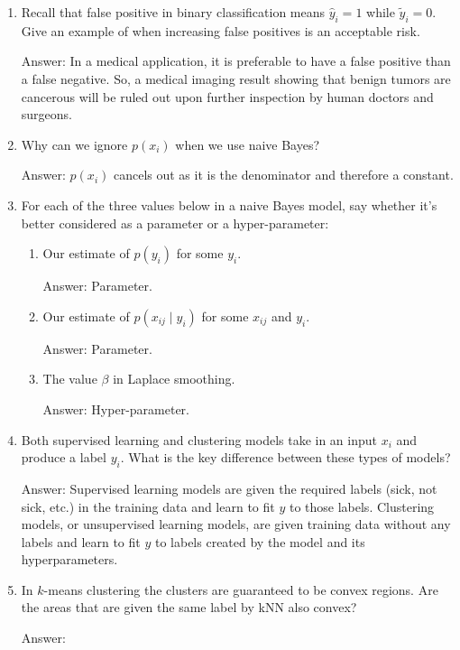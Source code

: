 \documentclass{article}
\newenvironment{answer}{\par\begingroup\color{gre}Answer: }{\endgroup}
\begin{document}
\begin{enumerate}
\begin{answer}
        \end{answer}
        \item Recall that false positive in binary classification means $\hat y_i=1$ while $\tilde y_i = 0$. Give an example of when increasing false positives is an acceptable risk.
        \begin{answer}
        In a medical application, it is preferable to have a false positive than a false negative. So, a medical imaging result showing that benign tumors are cancerous will be ruled out upon further inspection by human doctors and surgeons.
        \end{answer}
        \item Why can we ignore $p(x_i)$ when we use naive Bayes?
        \begin{answer}
        $p(x_i)$ cancels out as it is the denominator and therefore a constant.
        \end{answer}
        \item For each of the three values below in a naive Bayes model, say whether it's better considered as a parameter or a hyper-parameter:
        \begin{enumerate}
            \item Our estimate of $p(y_i)$ for some $y_i$.
            \begin{answer}
            Parameter.
            \end{answer}
            \item Our estimate of $p(x_{ij} \mid y_i)$ for some $x_{ij}$ and $y_i$.
            \begin{answer}
            Parameter.
            \end{answer}
            \item The value $\beta$ in Laplace smoothing.
            \begin{answer}
            Hyper-parameter.
            \end{answer}
        \end{enumerate}
        \item Both supervised learning and clustering models take in an input $x_i$ and produce a label $y_i$. What is the key difference between these types of models?
        \begin{answer}
        Supervised learning models are given the required labels (sick, not sick, etc.) in the training data and learn to fit $y$ to those labels. Clustering models, or unsupervised learning models, are given training data without any labels and learn to fit $y$ to labels created by the model and its hyperparameters.
        \end{answer}
        \item In $k$-means clustering the clusters are guaranteed to be convex regions. Are the areas that are given the same label by kNN also convex?
        \begin{answer}

        \end{answer}
    \end{enumerate}
\end{document}
